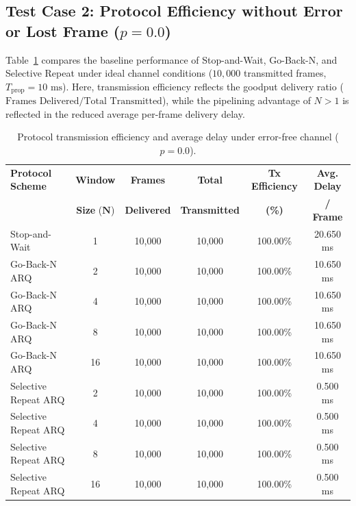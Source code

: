 \documentclass[11pt,a4paper]{article}
\begin{document}
\subsection{Test Case 2: Protocol Efficiency without Error or Lost Frame \texorpdfstring{(\(p = 0.0\))}{(p = 0.0)}}

Table~\ref{tab:test2_noiseless} compares the baseline performance of Stop-and-Wait, Go-Back-N, and Selective Repeat under ideal channel conditions (\(10{,}000\) transmitted frames, \(T_{\text{prop}} = 10\text{ ms}\)). Here, transmission efficiency reflects the goodput delivery ratio (\(\text{Frames Delivered} / \text{Total Transmitted}\)), while the pipelining advantage of \(N > 1\) is reflected in the reduced average per-frame delivery delay.

\begin{table}[H]
    \centering
    \small
    \renewcommand{\arraystretch}{0.94}
    \setlength{\tabcolsep}{7pt}
    \begin{tabular}{lccccc}
        \toprule
        \textbf{Protocol Scheme} & \textbf{Window} & \textbf{Frames} & \textbf{Total} & \textbf{Tx Efficiency} & \textbf{Avg. Delay} \\
        & \textbf{Size} (\(\boldsymbol{N}\)) & \textbf{Delivered} & \textbf{Transmitted} & \textbf{(\%)} & \textbf{/ Frame} \\
        \midrule
        Stop-and-Wait        & 1  & 10,000 & 10,000 & 100.00\% & 20.650 ms \\
        \midrule
        Go-Back-N ARQ        & 2  & 10,000 & 10,000 & 100.00\% & 10.650 ms \\
        Go-Back-N ARQ        & 4  & 10,000 & 10,000 & 100.00\% & 10.650 ms \\
        Go-Back-N ARQ        & 8  & 10,000 & 10,000 & 100.00\% & 10.650 ms \\
        Go-Back-N ARQ        & 16 & 10,000 & 10,000 & 100.00\% & 10.650 ms \\
        \midrule
        Selective Repeat ARQ & 2  & 10,000 & 10,000 & 100.00\% & 0.500 ms \\
        Selective Repeat ARQ & 4  & 10,000 & 10,000 & 100.00\% & 0.500 ms \\
        Selective Repeat ARQ & 8  & 10,000 & 10,000 & 100.00\% & 0.500 ms \\
        Selective Repeat ARQ & 16 & 10,000 & 10,000 & 100.00\% & 0.500 ms \\
        \bottomrule
    \end{tabular}
    \caption{Protocol transmission efficiency and average delay under error-free channel (\(p = 0.0\)).}
    \label{tab:test2_noiseless}
\end{table}
\end{document}

